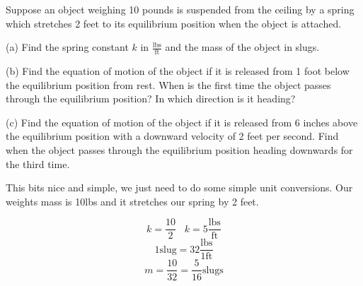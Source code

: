 \documentclass[10pt,letterpaper]{amspset}
\begin{document}
\pagebreak


\begin{problem}[6]
    Suppose an object weighing 10 pounds is suspended from the ceiling by a spring which stretches 2 feet to its equilibrium position when the object is attached. \medskip
    
    (a) Find the spring constant $k$ in $\frac{\text{lbs}}{\text{ft}}$ and the mass of the object in slugs. \medskip
    
    (b) Find the equation of motion of the object if it is released from 1 foot below the equilibrium position from rest. When is the first time the object passes through the equilibrium position? In which direction is it heading? \medskip
    
    (c) Find the equation of motion of the object if it is released from 6 inches above the equilibrium position with a downward velocity of 2 feet per second. Find when the object passes through the equilibrium position heading downwards for the third time.
\end{problem}

\begin{solution}[(a)]
    This bits nice and simple, we just need to do some simple unit conversions. Our weights mass is 10lbs and it stretches our spring by 2 feet. 
    
    \[k = \frac{10}{2} \; \; \; \boxed{k = 5 \frac{ \text{lbs} }{ \text{ft} }  }\]
    \[1 \text{slug} = 32 \frac{\text{lbs} }{1 \text{ft} }\]
    \[m = \frac{10}{32} = \boxed{ \frac{5}{16} \text{slugs} }\] 
\end{solution}
\end{document}
